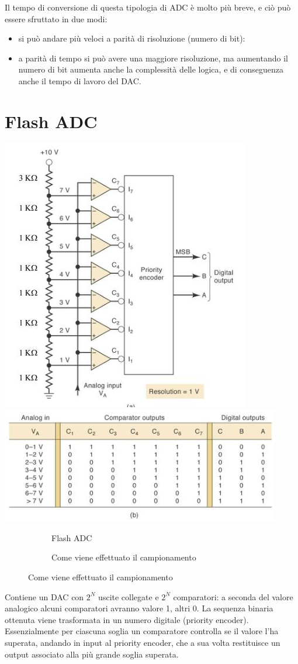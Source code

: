 \documentclass[
]{book}
\providecommand{\tightlist}{%
  \setlength{\itemsep}{0pt}\setlength{\parskip}{0pt}}
\begin{document}
Il tempo di conversione di questa tipologia di ADC è molto più breve, e
ciò può essere sfruttato in due modi:

\begin{itemize}
\tightlist
\item
  si può andare più veloci a parità di risoluzione (numero di bit):
\item
  a parità di tempo si può avere una maggiore risoluzione, ma aumentando
  il numero di bit aumenta anche la complessità delle logica, e di
  conseguenza anche il tempo di lavoro del DAC.
\end{itemize}

\section{Flash ADC}\label{flash-adc}

\includegraphics[width=0.4\linewidth,height=\textheight,keepaspectratio]{immagini/46.png}
\includegraphics[width=0.5\linewidth,height=\textheight,keepaspectratio]{immagini/47.png}

\begin{figure}[!h]
\begin{subfigure}[t]{0.4\textwidth}
\caption{Flash ADC}
\end{subfigure}
\hfill
\begin{subfigure}[t]{0.6\textwidth}
\caption{Come viene effettuato il campionamento}
\end{subfigure}
\end{figure}

Contiene un DAC con \(2^{N}\) uscite collegate e \(2^N\) comparatori: a
seconda del valore analogico alcuni comparatori avranno valore 1, altri
0. La sequenza binaria ottenuta viene trasformata in un numero digitale
(priority encoder). Essenzialmente per ciascuna soglia un comparatore
controlla se il valore l'ha superata, andando in input al priority
encoder, che a sua volta restituisce un output associato alla più grande
soglia superata.
\end{document}
